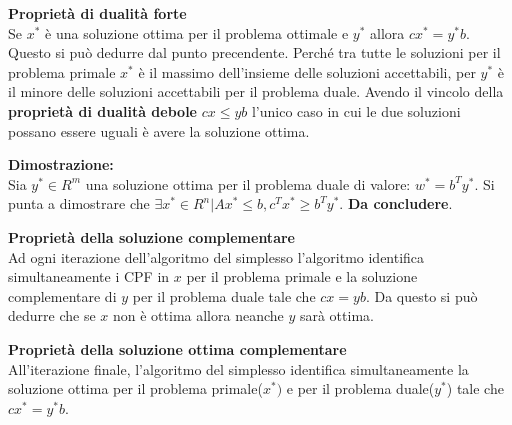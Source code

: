 \documentclass{article}
\begin{document}
\textbf{Proprietà di dualità forte}\\
Se ${x}^{\ast}$ è una soluzione ottima per il problema ottimale e ${y}^{\ast}$ allora $cx^{\ast}=y^{\ast}b$. Questo si può dedurre dal punto precendente. Perché tra tutte le soluzioni per il problema primale $x^{\ast}$ è il massimo dell'insieme delle soluzioni accettabili, per $y^{\ast}$ è il minore delle soluzioni accettabili per il problema duale. Avendo il vincolo della \textbf{proprietà  di dualità debole} $cx\le yb$ l'unico caso in cui le due soluzioni possano essere uguali è avere la soluzione ottima.
\begin{tcolorbox}
  \textbf{Dimostrazione:}\\
  Sia $y^{\ast} \in R^m$ una soluzione ottima per il problema duale di valore: $w^{\ast}=b^Ty^{\ast}$. Si punta a dimostrare che $\exists x^{\ast} \in R^n|Ax^{\ast}\le b, c^Tx^{\ast} \ge b^Ty^{\ast}$.
  \textbf{Da concludere}.
\end{tcolorbox}
\textbf{Proprietà della soluzione complementare}\\
Ad ogni iterazione dell'algoritmo del simplesso l'algoritmo identifica simultaneamente i CPF in $x$ per il problema primale e la soluzione complementare di $y$ per il problema duale tale che $cx=yb$. Da questo si può dedurre che se $x$ non è ottima allora neanche $y$ sarà ottima.

\textbf{Proprietà della soluzione ottima complementare}\\
All'iterazione finale, l'algoritmo del simplesso identifica simultaneamente la soluzione ottima per il problema primale($x^{\ast})$ e per il problema duale($y^{\ast}$) tale che $cx^{\ast}=y^{\ast}b$.\\
\end{document}
